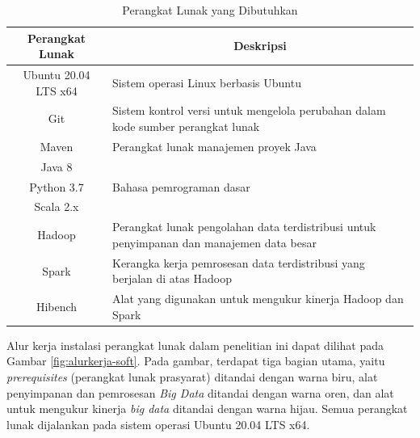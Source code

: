 \begin{table}[h]
	\centering
	\caption{Perangkat Lunak yang Dibutuhkan}
		\begin{tabular}{|c|p{9cm}|}
		\hline
			\textbf{Perangkat Lunak} & \multicolumn{1}{c|}{\textbf{Deskripsi}}                                                                                \\ \hline
			Ubuntu 20.04 LTS x64     & Sistem operasi Linux berbasis Ubuntu  \\ \hline
			Git                      & Sistem kontrol versi untuk mengelola perubahan dalam kode sumber perangkat lunak                                       \\ \hline
			Maven                    & Perangkat lunak manajemen proyek Java                            \\ \hline
			Java 8                   & \multirow{3}{*}{Bahasa pemrograman dasar}                                 \\ \cline{1-1}
			Python 3.7               &                                                                                                                        \\ \cline{1-1}
			Scala 2.x               &                                                                                                                        \\ \hline
			Hadoop                & Perangkat lunak pengolahan data terdistribusi untuk penyimpanan dan manajemen data besar                               \\ \hline
			Spark               & Kerangka kerja pemrosesan data terdistribusi yang berjalan di atas Hadoop                                              \\ \hline
			Hibench   & Alat yang digunakan untuk mengukur kinerja Hadoop dan Spark                                                            \\ \hline
		\end{tabular}
	\label{table:software-needs}
\end{table}

Alur kerja instalasi perangkat lunak dalam penelitian ini dapat dilihat pada Gambar \ref{fig:alurkerja-soft}. Pada gambar, terdapat tiga bagian utama, yaitu \textit{prerequisites} (perangkat lunak prasyarat) ditandai dengan warna biru, alat penyimpanan dan pemrosesan \textit{Big Data} ditandai dengan warna oren, dan alat untuk mengukur kinerja \textit{big data} ditandai dengan warna hijau. Semua perangkat lunak dijalankan pada sistem operasi Ubuntu 20.04 LTS x64.

